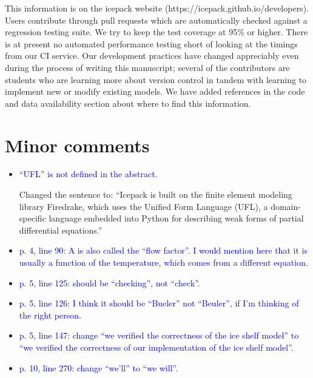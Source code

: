 \documentclass{article}
\theoremstyle{definition}
\theoremstyle{plain}
\begin{document}
\begin{enumerate}
This information is on the icepack website (https://icepack.github.io/developers).
Users contribute through pull requests which are automatically checked against a regression testing suite.
We try to keep the test coverage at 95\% or higher.
There is at present no automated performance testing short of looking at the timings from our CI service.
Our development practices have changed appreciably even during the process of writing this manuscript; several of the contributors are students who are learning more about version control in tandem with learning to implement new or modify existing models.
We have added references in the code and data availability section about where to find this information.

\end{enumerate}

\section*{Minor comments}

\begin{itemize}
\item \textcolor{blue}{``UFL'' is not defined in the abstract.}

Changed the sentence to: ``Icepack is built on the finite element modeling library Firedrake, which uses the Unified Form Language (UFL), a domain-specific language embedded into Python for describing weak forms of partial differential equations.''

\item \textcolor{blue}{p. 4, line 90: A is also called the ``flow factor''. I would mention here that it is usually a function of
the temperature, which comes from a different equation.}
\item \textcolor{blue}{p. 5, line 125: should be ``checking'', not ``check''.} \checkmark
\item \textcolor{blue}{p. 5, line 126: I think it should be ``Bueler'' not ``Beuler'', if I'm thinking of the right person.} \checkmark
\item \textcolor{blue}{p. 5, line 147: change ``we verified the correctness of the ice shelf model'' to ``we verified the correctness
of our implementation of the ice shelf model''.} \checkmark
\item \textcolor{blue}{p. 10, line 270: change ``we'll'' to ``we will''.} \checkmark
\end{itemize}
\end{document}
